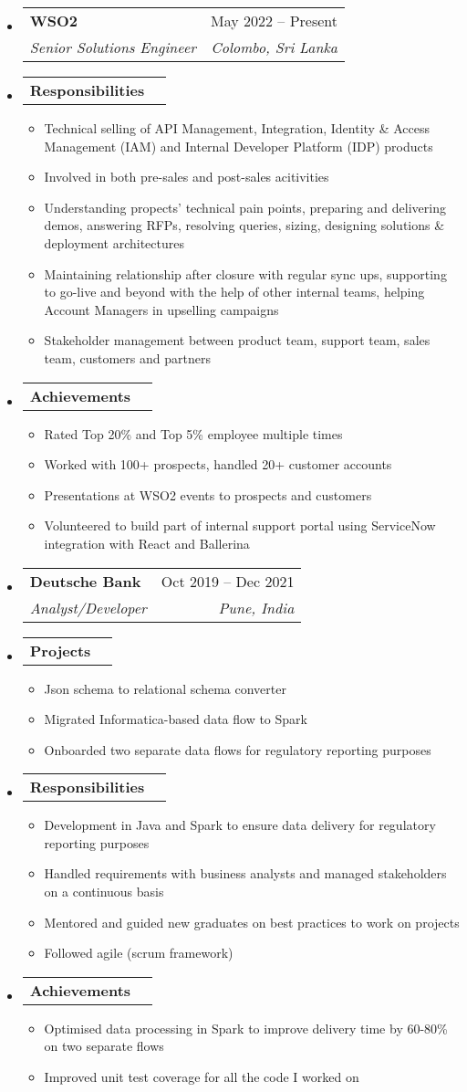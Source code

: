 \documentclass[letterpaper,12pt]{article}[leftmargin=*]
\makeatletter
\def \entryspacing {-0pt}
\newcommand{\resumeEntryStart}{\begin{itemize}[leftmargin=2.5mm]}
\newcommand{\resumeEntryEnd}{\end{itemize}\vspace{\entryspacing}}
\newcommand{\resumeItemListStart}{\begin{itemize}[leftmargin=4.5mm]}
\newcommand{\resumeItemListEnd}{\end{itemize}}
\newcommand{\resumeItem}[1]{
  \item\small{
    {#1 \vspace{-2pt}}
  }
}
\newcommand{\resumeEntryTSDL}[4]{
  \vspace{-1pt}\item[]
    \begin{tabularx}{0.97\textwidth}{X@{\hspace{60pt}}r}
      \textbf{\color{primary}#1} & {\firabook\color{accent}\small#2} \\
      \textit{\color{accent}\small#3} & \textit{\color{accent}\small#4} \\
    \end{tabularx}\vspace{-6pt}
}
\newcommand{\resumeEntryTD}[2]{
  \vspace{-1pt}\item[]
    \begin{tabularx}{0.97\textwidth}{X@{\hspace{60pt}}r}
      \textbf{\color{primary}#1} & {\firabook\color{accent}\small#2} \\
    \end{tabularx}\vspace{-6pt}
}
\makeatother
\begin{document}
  \resumeEntryStart
    \resumeEntryTSDL
      {WSO2}{May 2022 -- Present}
      {Senior Solutions Engineer}{Colombo, Sri Lanka}
    \resumeEntryTD
    {Responsibilities}{}
    \resumeItemListStart
      \resumeItem {Technical selling of API Management, Integration, Identity \& Access Management (IAM) and Internal Developer Platform (IDP) products}
      \resumeItem {Involved in both pre-sales and post-sales acitivities}
      \resumeItem {Understanding propects' technical pain points, preparing and delivering demos, answering RFPs, resolving queries, sizing, designing solutions \& deployment architectures}
      \resumeItem {Maintaining relationship after closure with regular sync ups, supporting to go-live and beyond with the help of other internal teams, helping Account Managers in upselling campaigns}
      \resumeItem {Stakeholder management between product team, support team, sales team, customers and partners}
    \resumeItemListEnd

    \resumeEntryTD
    {Achievements}{}
    \resumeItemListStart
      \resumeItem {Rated Top 20\% and Top 5\% employee multiple times}
      \resumeItem {Worked with 100+ prospects, handled 20+ customer accounts}
      \resumeItem {Presentations at WSO2 events to prospects and customers}
      \resumeItem {Volunteered to build part of internal support portal using ServiceNow integration with React and Ballerina}
    \resumeItemListEnd
  \resumeEntryEnd

  \resumeEntryStart
    \resumeEntryTSDL
      {Deutsche Bank}{Oct 2019 -- Dec 2021}
      {Analyst/Developer}{Pune, India}
    \resumeEntryTD
    {Projects}{}
    \resumeItemListStart
      \resumeItem {Json schema to relational schema converter}
      \resumeItem {Migrated Informatica-based data flow to Spark}
      \resumeItem {Onboarded two separate data flows for regulatory reporting purposes}
    \resumeItemListEnd
    
    \resumeEntryTD
    {Responsibilities}{}
    \resumeItemListStart
      \resumeItem {Development in Java and Spark to ensure data delivery for regulatory reporting purposes}
      \resumeItem {Handled requirements with business analysts and managed stakeholders on a continuous basis}
      \resumeItem {Mentored and guided new graduates on best practices to work on projects}
      \resumeItem {Followed agile (scrum framework)}
    \resumeItemListEnd

    \resumeEntryTD
    {Achievements}{}
    \resumeItemListStart
      \resumeItem {Optimised data processing in Spark to improve delivery time by 60-80\% on two separate flows}
      \resumeItem {Improved unit test coverage for all the code I worked on}
    \resumeItemListEnd
  \resumeEntryEnd
\end{document}
